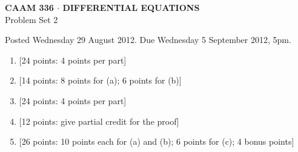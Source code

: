 \documentclass[10pt]{article}
\begin{document}
\begin{center}
\large \textsf{\textbf{CAAM 336 $\cdot$ DIFFERENTIAL EQUATIONS}\\[0.5em]
Problem Set 2 }
\end{center}

Posted Wednesday 29 August 2012. Due Wednesday 5 September 2012, 5pm.

\begin{enumerate}
\item {[24 points: 4 points per part]}\\  

\vspace*{1em}
\item {[14 points: 8 points for (a); 6 points for (b)]}\\  

\vspace*{1em}
\item {[24 points: 4 points per part]}\\  

\vspace*{1em}
\item {[12 points: give partial credit for the proof]}\\  

\vspace*{2em}

\item {[26 points: 10 points each for (a) and (b); 6 points for (c); 4 bonus points]}\\  

\end{enumerate}
\end{document}
